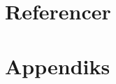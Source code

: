 \documentclass[a4paper,11pt,fleqn,twoside,openright]{memoir}
\begin{document}
\part{Referencer}



\newpage
\listoffigures

\listoftables


\@openrighttrue\makeatother



\part{Appendiks}
\appendix
{}













\newpage
\printindex
\end{document}
